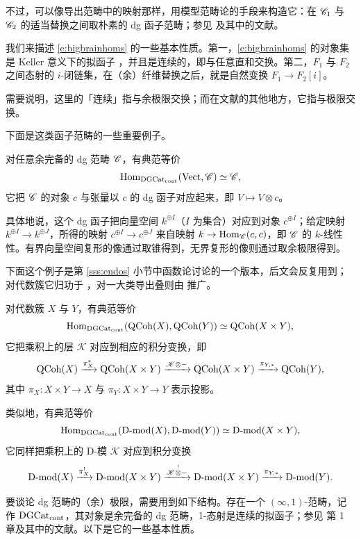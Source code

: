 不过，可以像导出范畴中的映射那样，用模型范畴论的手段来构造它：在 $\mathscr{C}_1$ 与 $\mathscr{C}_2$ 的适当替换之间取朴素的 dg 函子范畴；参见 \cite{toenlectures} 及其中的文献。

我们来描述 \eqref{e:bigbrainhoms} 的一些基本性质。第一，\eqref{e:bigbrainhoms} 的对象集是 Keller 意义下的拟函子 \cite{kellerderiving}，并且是连续的，即与任意直和交换。第二，$F_1$ 与 $F_2$ 之间态射的 $i$-闭链集，在（余）纤维替换之后，就是自然变换 $F_1 \rightarrow F_2[i]$。

\begin{re} 需要说明，这里的「连续」指与余极限交换；而在文献的其他地方，它指与极限交换。\end{re}

下面是这类函子范畴的一些重要例子。

\begin{ex} 对任意余完备的 dg 范畴 $\mathscr{C}$，有典范等价
%
\[
     \operatorname{Hom}_{\operatorname{DGCat}_{\operatorname{cont}}}(\operatorname{Vect}, \mathscr{C}) \simeq \mathscr{C},
\]
%
它把 $\mathscr{C}$ 的对象 $c$ 与张量以 $c$ 的 dg 函子对应起来，即 $V \mapsto V \otimes c$。

具体地说，这个 dg 函子把向量空间 $k^{\oplus I}$（$I$ 为集合）对应到对象 $c^{\oplus I}$；给定映射 $k^{\oplus I} \rightarrow k^{\oplus J}$，所得的映射 $c^{\oplus I} \rightarrow c^{\oplus J}$ 来自映射 $k \rightarrow \operatorname{Hom}_{\mathscr{C}}(c, c)$，即 $\mathscr{C}$ 的 $k$-线性性。有界向量空间复形的像通过取锥得到，无界复形的像则通过取余极限得到。
\end{ex}

\begin{ex} 下面这个例子是第 \ref{sss:endos} 小节中函数论讨论的一个版本，后文会反复用到；对代数簇它归功于 \cite{toenpaper}，对一大类导出叠则由 \cite{benzvifrancisnadler} 推广。

对代数簇 $X$ 与 $Y$，有典范等价
%
\[
   \operatorname{Hom}_{\operatorname{DGCat}_{\operatorname{cont}}}(\operatorname{QCoh}(X), \operatorname{QCoh}(Y)) \simeq \operatorname{QCoh}(X \times Y),
\]
%
它把乘积上的层 $\mathscr{K}$ 对应到相应的积分变换，即
%
\[
   \operatorname{QCoh}(X) \xrightarrow{\pi_X^*} \operatorname{QCoh}(X \times Y) \xrightarrow{\mathscr{K} \otimes - } \operatorname{QCoh}(X \times Y) \xrightarrow{\pi_{Y, *}} \operatorname{QCoh}(Y),
\]
%
其中 $\pi_X: X \times Y \rightarrow X$ 与 $\pi_Y: X \times Y \rightarrow Y$ 表示投影。

类似地，有典范等价
%
\[
   \operatorname{Hom}_{\operatorname{DGCat}_{\operatorname{cont}}}(\operatorname{D-mod}(X), \operatorname{D-mod}(Y)) \simeq \operatorname{D-mod}(X \times Y),
\]
%
它同样把乘积上的 D-模 $\mathscr{K}$ 对应到积分变换
%
\[
   \operatorname{D-mod}(X) \xrightarrow{\pi_X^!} \operatorname{D-mod}(X \times Y) \xrightarrow{ \mathscr{K} \overset ! \otimes - } \operatorname{D-mod}(X \times Y) \xrightarrow{\pi_{Y, *}} \operatorname{D-mod}(Y).
\]
%
\end{ex}

\ssszh\label{s:dgcat} 要谈论 dg 范畴的（余）极限，需要用到如下结构。存在一个 $(\infty, 1)$-范畴，记作 $\operatorname{DGCat}_{\operatorname{cont}}$，其对象是余完备的 dg 范畴，1-态射是连续的拟函子；参见 \cite{gaitsroz} 第 1 章及其中的文献。以下是它的一些基本性质。

